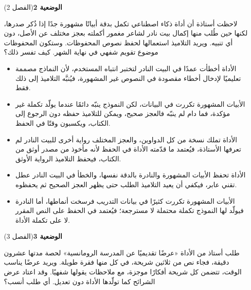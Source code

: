 \documentclass[11pt,a4paper]{article}
\begin{document}
\par\vspace{6pt}
\noindent
{\large\khatt\textbf{الوضعية 2}}\hfill{\small(الفصل 2)}\par\nopagebreak\vspace{3pt}
\setlength{\fboxsep}{7pt}\colorbox{gray!10}{\parbox{\dimexpr\linewidth-14pt}{لاحظت أستاذة أن أداة ذكاء اصطناعي تكمل بدقة أبياتًا مشهورة جدًا إذا ذُكر صدرها، لكنها حين طُلب منها إكمال بيت نادر لشاعر مغمور أكملته بعجز مختلف عن الأصل، دون أي تنبيه. ويريد التلاميذ استعمالها لحفظ نصوص المحفوظات. وستكون المحفوظات موضوع تقويم شفهي في نهاية الشهر. كيف تفسر ذلك؟}}\par\nopagebreak
\begin{itemize}[leftmargin=1.0cm, labelsep=6pt, itemsep=3pt, topsep=4pt, parsep=0pt]
  \item[\textbf{أ)}] الأداة أخطأت عمدًا في البيت النادر لتختبر انتباه المستخدم، لأن النماذج مصممة تعليميًا لإدخال أخطاء مقصودة في النصوص غير المشهورة، فيُنبَّه التلاميذ إلى ذلك فقط.
  \item[\textbf{ب)}] الأبيات المشهورة تكررت في البيانات، لكن النموذج ينبّه دائمًا عندما يولّد تكملة غير مؤكدة، فما دام لم ينبّه فالعجز صحيح، ويمكن للتلاميذ حفظه دون الرجوع إلى الكتاب، ويكسبون وقتًا في الحفظ.
  \item[\textbf{ج)}] الأداة تملك نسخة من كل الدواوين، والعجز المختلف رواية أخرى للبيت النادر لم تعرفها الأستاذة، فيُعتمد ما قدّمته الأداة في الحفظ لأنه مأخوذ من مصدر أوثق من الكتاب، فيحفظ التلاميذ الرواية الأوثق.
  \item[\textbf{د)}] الأداة تحفظ الأبيات المشهورة والنادرة بالدقة نفسها، والخطأ في البيت النادر عطل تقني عابر، فيكفي أن يعيد التلاميذ الطلب حتى يظهر العجز الصحيح ثم يحفظوه.
  \item[\textbf{هـ)}] الأبيات المشهورة تكررت كثيرًا في بيانات التدريب فرسخت أنماطها، أما النادرة فيولّد لها النموذج تكملة محتملة لا مسترجعة؛ فيُعتمد في الحفظ على النص المقرر لا على تكملة الأداة.
\end{itemize}
\par\vspace{6pt}
\noindent
{\large\khatt\textbf{الوضعية 3}}\hfill{\small(الفصل 3)}\par\nopagebreak\vspace{3pt}
\setlength{\fboxsep}{7pt}\colorbox{gray!10}{\parbox{\dimexpr\linewidth-14pt}{طلب أستاذ من الأداة «عرضًا تقديميًا عن المدرسة الرومانسية» لحصة مدتها عشرون دقيقة، فجاء نص من ثلاثين شريحة، في كل منها فقرة طويلة. ويريد عرضًا يناسب الوقت، تتضمن كل شريحة أفكارًا موجزة، مع ملاحظات يقولها شفهيًا. وقد اعتاد عرض الشرائح كما تولّدها الأداة دون تعديل. أي طلب أنسب؟}}\par\nopagebreak
\end{document}

